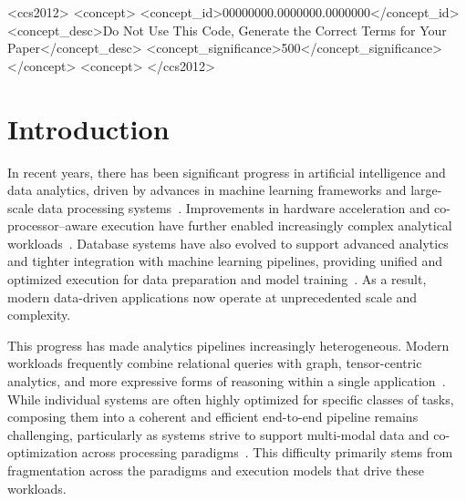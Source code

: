 \documentclass[sigconf,nonacm]{acmart}
\begin{document}
\begin{CCSXML}
<ccs2012>
 <concept>
  <concept_id>00000000.0000000.0000000</concept_id>
  <concept_desc>Do Not Use This Code, Generate the Correct Terms for Your Paper</concept_desc>
  <concept_significance>500</concept_significance>
 </concept>
 <concept>
</ccs2012>
\end{CCSXML}




\maketitle

\section{Introduction}
In recent years, there has been significant progress in artificial intelligence and data analytics, driven by advances in machine learning frameworks and large-scale data processing systems~\cite{DBLP:journals/pvldb/LowGKBGH12,DBLP:journals/pvldb/BoehmDEEMPRRSST16}. Improvements in hardware acceleration and co-processor–aware execution have further enabled increasingly complex analytical workloads~\cite{DBLP:conf/sigmod/BressFT16,jungmair2025towards}. Database systems have also evolved to support advanced analytics and tighter integration with machine learning pipelines, providing unified and optimized execution for data preparation and model training~\cite{DBLP:journals/pvldb/HellersteinRSWFGNWFLK12,DBLP:journals/pvldb/ZhaoAK24}. As a result, modern data-driven applications now operate at unprecedented scale and complexity.

This progress has made analytics pipelines increasingly heterogeneous. Modern workloads frequently combine relational queries with graph, tensor-centric analytics, and more expressive forms of reasoning within a single application~\cite{tian2019synergistic, gandhi2023tensor}. While individual systems are often highly optimized for specific classes of tasks, composing them into a coherent and efficient end-to-end pipeline remains challenging, particularly as systems strive to support multi-modal data and co-optimization across processing paradigms~\cite{gandhi2023tensor, he2022query}. This difficulty primarily stems from fragmentation across the paradigms and execution models that drive these workloads.
\end{document}
